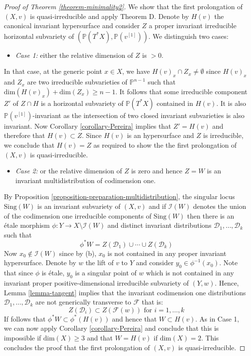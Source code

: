 \documentclass[12pt]{amsart}
\renewcommand{\P}{\mathbb{P}}
\theoremstyle{definition}
\theoremstyle{plain}
\theoremstyle{exampstyle}
\theoremstyle{exampstyle}\newtheorem{thmxbis}{Theorem}
\numberwithin{equation}{section}
\theoremstyle{remark}
\begin{document}
\begin{proof}[Proof of Theorem \ref{theorem-minimality2}]
We show that the first prolongation of $(X,v)$ is quasi-irreducible and apply Theorem D. Denote by $H(v)$ the canonical invariant hypersurface and consider $Z$ a proper invariant irreducible horizontal subvariety of $(\P(T^\ast X), \P(v^{[1]}))$. We distinguish two cases: 

\begin{itemize} 
\item \textit{Case 1:} either the relative dimension of $Z$ is $> 0$. 
\end{itemize} 
In that case, at the generic point $x \in X$, we have $H(v)_x \cap Z_x \neq \emptyset$ since $H(v)_x$ and $Z_x$ are two irreducible subvarieties of $\P^{n-1}$ such that $\mathrm{dim}(H(v)_x) + \mathrm{dim}(Z_x) \geq n - 1$.
It follows that some irreducible component $Z'$ of $Z \cap H$ is a horizontal subvariety of $\P(T^\ast X)$ contained in $H(v)$. It is also $\P(v^{[1]})$-invariant as the intersection of two closed invariant subvarieties is also invariant. Now Corollary \ref{corollary-Pereira} implies that $Z' = H(v)$ and therefore that  $H(v) \subset Z$. Since $H(v)$ is an hypersurface and $Z$ is irreducible, we conclude that $H(v) = Z$ as required to show the the first prolongation of $(X,v)$ is quasi-irreducible. 

\begin{itemize} 
\item \textit{Case 2:} or the relative dimension of $Z$ is zero and hence $Z = W$ is an invariant multidistribution of codimension one. 
\end{itemize} 
By Proposition \ref{proposition-preparation-multidistribution}, the singular locus $\mathrm{Sing}(W)$ is an invariant subvariety of $(X,v)$ and if $\mathcal I(W)$ denotes the union of the codimension one irreducible components of $\mathrm{Sing}(W)$ then there is an étale morphism $\phi: Y \rightarrow X \setminus \mathcal I(W)$
and distinct invariant distributions $\mathcal D_1,\ldots, \mathcal D_k $ such that $$\phi^\ast W = Z(\mathcal D_1) \cup \cdots \cup Z(\mathcal D_k)$$
Now $x_0 \notin \mathcal I(W)$ since by (b), $x_0$ is not contained in any proper invariant hypersurface. Denote by $w$ the lift of $v$ to $Y$ and consider $y_0 \in \phi^{-1}(x_0)$. Note that since $\phi$ is étale, $y_0$ is a singular point of $w$ which is not contained in  any invariant proper positive-dimensional irreducible subvariety of $(Y,w)$. Hence, Lemma \ref{lemma-tangent} implies that the invariant codimension one distributions $\mathcal D_1,\ldots, \mathcal D_k$ are not generically transverse to $\mathcal F$  that is:
$$  Z(\mathcal D_i) \subset Z(\mathcal F(w))  \text{ for } i = 1,\ldots , k  $$
If follows that $\phi^\ast W \subset  \phi^\ast (H(v))$  and hence that $W \subset H(v)$. As in Case 1, we can now apply Corollary \ref{corollary-Pereira} and conclude that this is impossible if $\mathrm{dim}(X) \geq 3$ and that $W = H(v)$ if $\mathrm{dim}(X) = 2$.  This concludes the proof that the first prolongation of $(X,v)$ is quasi-irreducible. 



\end{proof}
\end{document}
